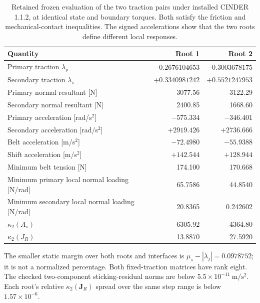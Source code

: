 \documentclass[11pt]{report}
\numberwithin{equation}{section}
\newcommand{\vect}[1]{\bm{#1}}
\begin{document}
\begin{table}[!htbp]
\centering\small
\begin{tabular}{@{}lrr@{}}
\toprule
Quantity & Root 1 & Root 2 \\ \midrule
Primary traction $\lambda_p$ & $-0.2676104653$ & $-0.3003678175$ \\
Secondary traction $\lambda_s$ & $+0.3340981242$ & $+0.5521247953$ \\
Primary normal resultant [N] & 3077.56 & 3122.29 \\
Secondary normal resultant [N] & 2400.85 & 1668.60 \\
Primary acceleration [rad/s$^2$] & $-575.334$ & $-346.401$ \\
Secondary acceleration [rad/s$^2$] & $+2919.426$ & $+2736.666$ \\
Belt acceleration [m/s$^2$] & $-72.4980$ & $-55.9388$ \\
Shift acceleration [m/s$^2$] & $+142.544$ & $+128.944$ \\
Minimum belt tension [N] & 174.100 & 170.668 \\
Minimum primary local normal loading [N/rad] & 65.7586 & 44.8540 \\
Minimum secondary local normal loading [N/rad] & 20.8365 & 0.242602 \\
$\kappa_2(A_s)$ & 6305.92 & 4364.80 \\
$\kappa_2(J_R)$ & 13.8870 & 27.5920 \\
\bottomrule
\end{tabular}
\caption{Retained frozen evaluation of the two traction pairs under installed
CINDER 1.1.2, at identical state and boundary torques. Both satisfy the
friction and mechanical-contact inequalities. The signed accelerations
show that the two roots define different local responses.}
\label{tab:closure_selected_roots}
\end{table}

The smaller static margin over both roots and interfaces is
\(\mu_s-|\lambda_j|=0.0978752\); it is not a normalized percentage.
Both fixed-traction matrices have rank eight. The checked
two-component sticking-residual norms are below
\(5.5\times10^{-11}~\mathrm{m/s^2}\). Each root's relative
\(\kappa_2(\vect J_R)\) spread over the same step range is below
\(1.57\times10^{-6}\).
\end{document}
